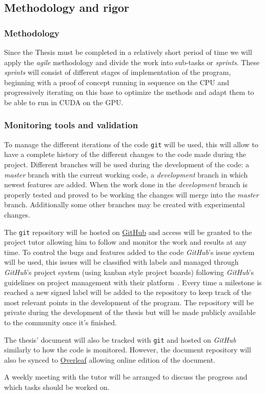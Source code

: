 \pagebreak
\subsection{Methodology and rigor}

\subsubsection{Methodology}

Since the Thesis must be completed in a relatively short period of time we will
apply the \emph{agile} methodology and divide the work into sub-tasks or
\emph{sprints}. These \emph{sprints} will consist of different stages of
implementation of the program, beginning with a proof of concept running in
sequence on the CPU and progressively iterating on this base to optimize the
methods and adapt them to be able to run in CUDA on the GPU.

\subsubsection{Monitoring tools and validation}

To manage the different iterations of the code \texttt{git} will be used,
this will allow to have a complete history of the different changes to the code
made during the project. Different branches will be used during the development
of the code: a \emph{master} branch with the current working code, a
\emph{development} branch in which newest features are added. When the work done
in the \emph{development} branch is properly tested and proved to be working the
changes will merge into the \emph{master} branch. Additionally some
other branches may be created with experimental changes.

The \texttt{git} repository will be hosted on \href{github.com}{GitHub} and
access will be granted to the project tutor allowing him to follow and monitor
the work and results at any time. To control the bugs and features added to the
code \emph{GitHub}'s issue system will be used, this issues will be classified
with labels and managed through \emph{GitHub}'s project system (using kanban style
project boards) following \emph{GitHub}'s guidelines on project management with
their platform~\cite{github_managing_2021}.  Every time a milestone is reached a
new signed label will be added to the repository to keep track of the most
relevant points in the development of the program. The repository will be
private during the development of the thesis but will be made publicly available
to the community once it's finished.

The thesis' document will also be tracked with \texttt{git} and hosted on
\emph{GitHub} similarly to how the code is monitored. However, the document
repository will also be synced to \href{overleaf.com}{Overleaf} allowing online
edition of the document.

A weekly meeting with the tutor will be arranged to discuss the progress and
which tasks should be worked on.
